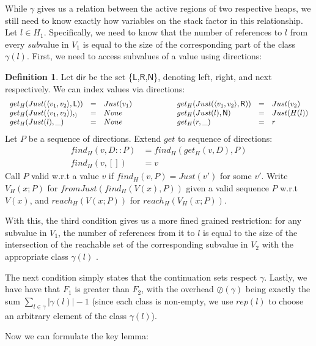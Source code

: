 \documentclass{easychair}
\newcommand{\ms}[1]{\ensuremath{\mathsf{#1}}}
\newcommand{\oh}[1]{\oslash(#1)}
\theoremstyle{definition}
\newtheorem{definition}{Definition}
\begin{document}
While $\gamma$ gives us a relation between the active regions of two respective heaps, 
we still need to know 
exactly how variables on the stack factor in this relationship. Let $l \in H_1$. 
Specifically, we need to know that the number of references to $l$ from every \emph{sub}value
in $V_1$ is equal to the size of the corresponding part of the class $\gamma(l)$.  
First, we need to access 
subvalues of a value using directions: 

\begin{definition}
	Let \ms{dir} be the set \{\ms{L},\ms{R},\ms{N}\}, denoting left, right, and next 
	respectively. We can index values via directions:
        $$
	\begin{array}{lclclcl}
		get_H(Just(\pairexcst{v_1}{v_2},\ms{L})) &=& Just(v_1) & \hspace{4em} &
		get_H(Just(\pairexcst{v_1}{v_2},\ms{R})) &=& Just(v_2)\\
		get_H(Just(\pairexcst{v_1}{v_2}),_) &=& None &&
		get_H(Just(l),\ms{N}) &=& Just(H(l)) \\
		get_H(Just(l), \_) &=& None &&
		get_H(r,\_) &=& r
	\end{array}
        $$
	Let $P$ be a sequence of directions. Extend $get$ to sequence of directions:
	\begin{align*}
		find_H(v,D::P) &= find_H(get_H(v,D),P)\\
		find_H(v,[]) &= v
	\end{align*}
	Call $P$ valid w.r.t a value $v$ if $find_H(v,P) = Just (v')$ for some $v'$.
	Write $V_H(x;P)$ for $fromJust(find_H(V(x),P))$ given a valid sequence $P$ w.r.t $V(x)$,
	and $reach_H(V(x;P))$ for $reach_H(V_H(x;P))$.
\end{definition}

With this, the third condition gives us a more fined grained restriction: for any subvalue in $V_1$,
the number of references from it to $l$ is equal to the size of 
the intersection of the reachable set of the corresponding subvalue in $V_2$
with the appropriate class $\gamma(l)$ .

The next condition simply states that the continuation sets respect $\gamma$. Lastly, 
we have have that $F_1$ is greater than $F_2$, with the overhead $\oh{\gamma}$ being exactly the sum 
$\sum_{l \in \gamma} |\gamma(l)| - 1$ 
(since each class is non-empty, we use $rep(l)$ to choose an arbitrary element of the class $\gamma(l)$). 

Now we can formulate the key lemma:
\end{document}

